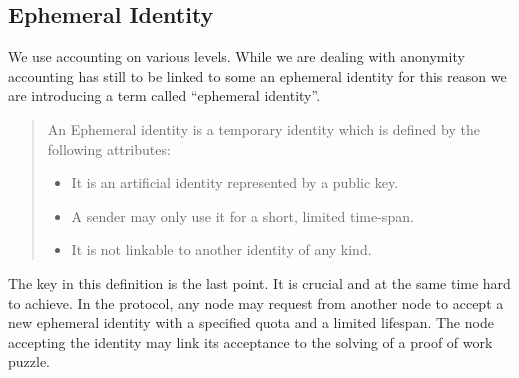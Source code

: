 \subsection{Ephemeral Identity\label{sec:ephemeralIdentity}}
We use accounting on various levels. While we are dealing with anonymity accounting has still to be linked to some an ephemeral identity for this reason we are introducing a term called ``ephemeral identity''.

\begin{quote}
	An Ephemeral identity is a temporary identity which is defined by the following attributes:
	\begin{itemize}
		\item It is an artificial identity represented by a public key.
		\item A sender may only use it for a short, limited time-span.
		\item It is not linkable to another identity of any kind.
	\end{itemize}
\end{quote}
The key in this definition is the last point. It is crucial and at the same time hard to achieve. In the protocol, any node may request from another node to accept a new ephemeral identity with a specified quota and a limited lifespan. The node accepting the identity may link its acceptance to the solving of a proof of work puzzle.

